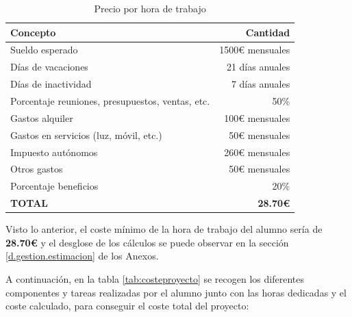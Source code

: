 \begin{table}[!h]
\centering
\bgroup
\def\arraystretch{1.3}
\begin{tabular}{l r}
\toprule
\textbf{Concepto} & \textbf{Cantidad} \\
 \midrule
 Sueldo esperado
& 
1500€ mensuales
 \\
 Días de vacaciones
& 
21 días anuales
 \\
 Días de inactividad
& 
7 días anuales
 \\
 Porcentaje reuniones, presupuestos, ventas, etc.
& 
50\%
 \\
 Gastos alquiler
& 
100€ mensuales
 \\
 Gastos en servicios (luz, móvil, etc.)
& 
50€ mensuales
 \\
 Impuesto autónomos
& 
260€ mensuales
 \\
 Otros gastos
& 
50€ mensuales
 \\
 Porcentaje beneficios
& 
20\%
\\
 \hline
 \textbf{TOTAL}
& 
\textbf{28.70€}
 \\
\bottomrule
\end{tabular}
\egroup
\caption{Precio por hora de trabajo}
\label{tab:preciohora}
\end{table}

Visto lo anterior, el coste mínimo de la hora de trabajo del alumno sería de \textbf{28.70€} y el desglose de los cálculos se puede observar en la sección \ref{d.gestion.estimacion} de los Anexos.

A continuación, en la tabla \ref{tab:costeproyecto} se recogen los diferentes componentes y tareas realizadas por el alumno junto con las horas dedicadas y el coste calculado, para conseguir el coste total del proyecto: 


